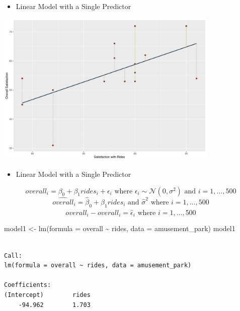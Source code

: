 \documentclass[
  ignorenonframetext,
]{beamer}
\newenvironment{Shaded}{\begin{snugshade}}{\end{snugshade}}
\newcommand{\AttributeTok}[1]{\textcolor[rgb]{0.40,0.45,0.13}{#1}}
\newcommand{\FunctionTok}[1]{\textcolor[rgb]{0.28,0.35,0.67}{#1}}
\newcommand{\NormalTok}[1]{\textcolor[rgb]{0.00,0.23,0.31}{#1}}
\newcommand{\OtherTok}[1]{\textcolor[rgb]{0.00,0.23,0.31}{#1}}
\newcommand{\SpecialCharTok}[1]{\textcolor[rgb]{0.37,0.37,0.37}{#1}}
\providecommand{\tightlist}{%
  \setlength{\itemsep}{0pt}\setlength{\parskip}{0pt}}\usepackage{longtable,booktabs,array}
\begin{document}
\begin{frame}{}
\label{section-10}
\begin{itemize}
\tightlist
\item
  Linear Model with a Single Predictor
\end{itemize}

\begin{center}
\includegraphics[width=0.8\textwidth,height=\textheight]{007_identifying_drivers_of_outcomes_linear_models_files/figure-beamer/unnamed-chunk-9-1.pdf}
\end{center}
\end{frame}

\begin{frame}[fragile]{}
\label{section-11}
\begin{itemize}
\tightlist
\item
  Linear Model with a Single Predictor
\end{itemize}

\[overall_{i} = \beta_0 + \beta_1 rides_i + \epsilon_i \text{ where } \epsilon_i \sim \mathcal{N}(0, \sigma^2) \text{ and } i = 1, \ldots, 500\]
\[\widehat{overall}_{i} = \widehat{\beta}_0 + \widehat{\beta}_1 rides_i \text{ and } \widehat{\sigma}^2 \text{ where } i = 1, \ldots, 500\]
\[overall_{i} - \widehat{overall}_{i} = \widehat{\epsilon}_i \text{ where } i = 1, \ldots, 500\]

\tiny

\begin{Shaded}
\begin{Highlighting}[]
\NormalTok{model1 }\OtherTok{\textless{}{-}} \FunctionTok{lm}\NormalTok{(}\AttributeTok{formula =}\NormalTok{ overall }\SpecialCharTok{\textasciitilde{}}\NormalTok{ rides, }\AttributeTok{data =}\NormalTok{ amusement\_park)}
\NormalTok{model1}
\end{Highlighting}
\end{Shaded}

\begin{verbatim}

Call:
lm(formula = overall ~ rides, data = amusement_park)

Coefficients:
(Intercept)        rides  
    -94.962        1.703  
\end{verbatim}
\end{frame}
\end{document}

